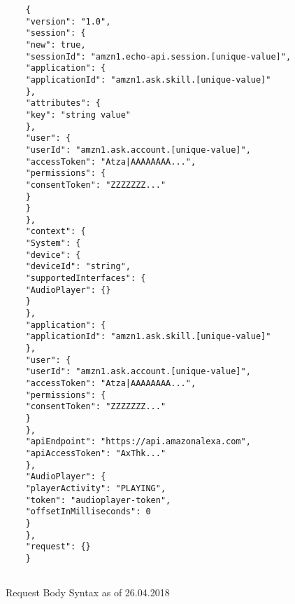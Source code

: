 \begin{figure}[h]
	\caption[HTTPS Request Body]{Request Body Syntax as of 26.04.2018}
	\label{jsonFromAlexa}
	\begin{verbatim}
	{
	"version": "1.0",
	"session": {
	"new": true,
	"sessionId": "amzn1.echo-api.session.[unique-value]",
	"application": {
	"applicationId": "amzn1.ask.skill.[unique-value]"
	},
	"attributes": {
	"key": "string value"
	},
	"user": {
	"userId": "amzn1.ask.account.[unique-value]",
	"accessToken": "Atza|AAAAAAAA...",
	"permissions": {
	"consentToken": "ZZZZZZZ..."
	}
	}
	},
	"context": {
	"System": {
	"device": {
	"deviceId": "string",
	"supportedInterfaces": {
	"AudioPlayer": {}
	}
	},
	"application": {
	"applicationId": "amzn1.ask.skill.[unique-value]"
	},
	"user": {
	"userId": "amzn1.ask.account.[unique-value]",
	"accessToken": "Atza|AAAAAAAA...",
	"permissions": {
	"consentToken": "ZZZZZZZ..."
	}
	},
	"apiEndpoint": "https://api.amazonalexa.com",
	"apiAccessToken": "AxThk..."
	},
	"AudioPlayer": {
	"playerActivity": "PLAYING",
	"token": "audioplayer-token",
	"offsetInMilliseconds": 0
	}
	},
	"request": {}
	}
	
	\end{verbatim}
\end{figure}







{}
